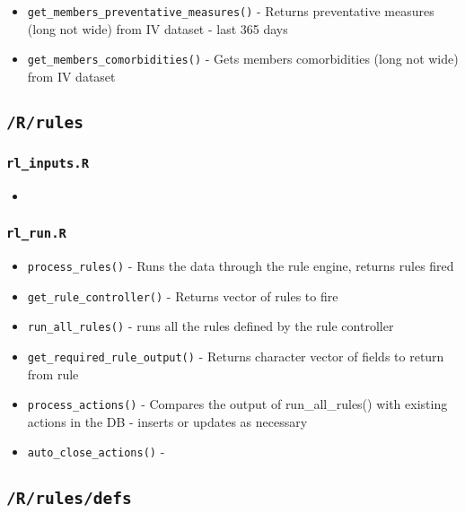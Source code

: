 \documentclass[
]{book}
\providecommand{\tightlist}{%
  \setlength{\itemsep}{0pt}\setlength{\parskip}{0pt}}
\begin{document}
\begin{itemize}
\tightlist
\item
  \texttt{get\_members\_preventative\_measures()} - Returns preventative measures (long not wide) from IV dataset - last 365 days
\item
  \texttt{get\_members\_comorbidities()} - Gets members comorbidities (long not wide) from IV dataset
\end{itemize}

\hypertarget{rrules}{%
\subsection{\texorpdfstring{\texttt{/R/rules}}{/R/rules}}\label{rrules}}

\hypertarget{rl_inputs.r}{%
\subsubsection{\texorpdfstring{\texttt{rl\_inputs.R}}{rl\_inputs.R}}\label{rl_inputs.r}}

\begin{itemize}
\item
\end{itemize}

\hypertarget{rl_run.r}{%
\subsubsection{\texorpdfstring{\texttt{rl\_run.R}}{rl\_run.R}}\label{rl_run.r}}

\begin{itemize}
\tightlist
\item
  \texttt{process\_rules()} - Runs the data through the rule engine, returns rules fired
\item
  \texttt{get\_rule\_controller()} - Returns vector of rules to fire
\item
  \texttt{run\_all\_rules()} - runs all the rules defined by the rule controller
\item
  \texttt{get\_required\_rule\_output()} - Returns character vector of fields to return from rule
\item
  \texttt{process\_actions()} - Compares the output of run\_all\_rules() with existing actions in the DB - inserts or updates as necessary
\item
  \texttt{auto\_close\_actions()} -
\end{itemize}

\hypertarget{rrulesdefs}{%
\subsection{\texorpdfstring{\texttt{/R/rules/defs}}{/R/rules/defs}}\label{rrulesdefs}}
\end{document}
